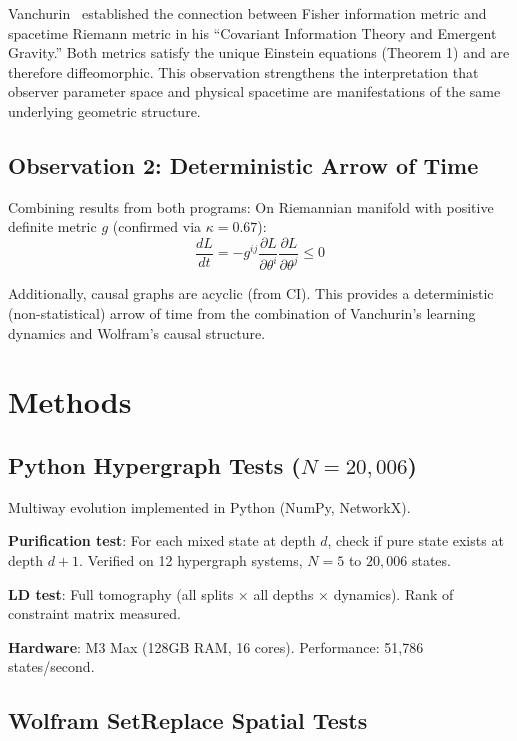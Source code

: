 \documentclass[11pt]{article}
\theoremstyle{definition}
\theoremstyle{remark}
\begin{document}
Vanchurin~\cite{Vanchurin2017} established the connection between Fisher information metric and spacetime Riemann metric in his ``Covariant Information Theory and Emergent Gravity.'' Both metrics satisfy the unique Einstein equations (Theorem 1) and are therefore diffeomorphic. This observation strengthens the interpretation that observer parameter space and physical spacetime are manifestations of the same underlying geometric structure.

\subsection{Observation 2: Deterministic Arrow of Time}

Combining results from both programs: On Riemannian manifold with positive definite metric $g$ (confirmed via $\kappa=0.67$):
\begin{equation}
\frac{dL}{dt} = -g^{ij}\frac{\partial L}{\partial \theta^i}\frac{\partial L}{\partial \theta^j} \leq 0
\end{equation}

Additionally, causal graphs are acyclic (from CI). This provides a deterministic (non-statistical) arrow of time from the combination of Vanchurin's learning dynamics and Wolfram's causal structure.

\section{Methods}

\subsection{Python Hypergraph Tests ($N=20{,}006$)}

Multiway evolution implemented in Python (NumPy, NetworkX).

\textbf{Purification test}: For each mixed state at depth $d$, check if pure state exists at depth $d+1$. Verified on 12 hypergraph systems, $N=5$ to $20{,}006$ states.

\textbf{LD test}: Full tomography (all splits $\times$ all depths $\times$ dynamics). Rank of constraint matrix measured.

\textbf{Hardware}: M3 Max (128GB RAM, 16 cores). Performance: 51,786 states/second.

\subsection{Wolfram SetReplace Spatial Tests}
\end{document}
